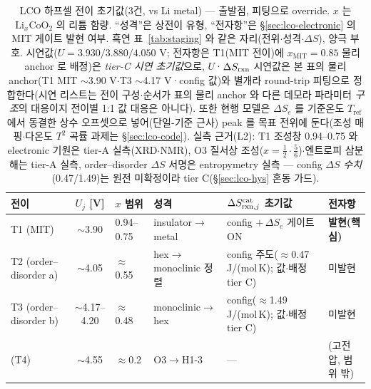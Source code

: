 \begin{table}[t]
\centering\footnotesize
\renewcommand{\arraystretch}{1.3}
\caption{LCO 하프셀 전이 초기값(3건, vs Li metal) --- 출발점, 피팅으로 override. $x$ 는
$\mathrm{Li}_x\mathrm{CoO_2}$ 의 리튬 함량. ``성격''은 상전이 유형, ``전자항''은 \S\ref{sec:lco-electronic} 의 MIT
게이트 발현 여부. 흑연 표~\ref{tab:staging} 와 같은 자리(전위$\cdot$성격$\cdot\Delta S$), 양극 부호.
시연값($U{=}3.930/3.880/4.050$ V; 전자항은 T1(MIT 전이)에
$x_\mathrm{MIT}{=}0.85$ 물리 anchor 로 배정)은
\emph{tier-C 시연 초기값}으로, $U$·$\Delta S_{\mathrm{rxn}}$ 시연값은 본 표의 물리 anchor(T1 MIT $\sim$3.90 V$\cdot$T3 $\sim$4.17 V·config 값)와
별개라 round-trip 피팅으로 정합한다(시연 리스트는 전이 구성$\cdot$순서가 표의 물리 anchor 와 다른 데모라 파라미터 \emph{구조}의 대응이지 전이별 1:1 값 대응은 아니다). 또한 현행 모델은 $\Delta S_e$ 를 기준온도 $T_\mathrm{ref}$ 에서
동결한 상수 오프셋으로 넣어(단일-기준 근사) peak 를 목표 전위에 둔다(조성 매핑$\cdot$다온도 $T^2$ 곡률
과제는 \S\ref{sec:lco-code}). 실측 근거(L2): T1 조성창 0.94--0.75 와 electronic 기원은 tier-A
실측\cite{menetrier1999}(XRD$\cdot$NMR), O3 질서상 조성($x{=}\tfrac12\cdot\tfrac56$)$\cdot$엔트로피 삼분해는 tier-A
실측\cite{reynier2004}, order--disorder $\Delta S$ 서명은 entropymetry 실측\cite{kim_entropymetry2020} ---
config $\Delta S$ \emph{수치}(0.47/1.49)는 원전 미확정이라 tier C(\S\ref{sec:lco-hys} 혼동 가드).}
\label{tab:lco-staging}
\begin{tabular}{@{}p{} c p{} p{} p{} p{}@{}}
\toprule
전이 & $U_j$ [V] & $x$ 범위 & 성격 & $\Delta S_{\mathrm{rxn},j}^\mathrm{cat}$ 초기값 & 전자항 \\
\midrule
T1 (MIT)              & $\sim$3.90        & 0.94--0.75 & insulator$\to$metal       & config $+\,\Delta S_e$ 게이트 ON & \textbf{발현(핵심)} \\
T2 (order--disorder a)& $\sim$4.05        & $\approx$0.55 & hex$\to$monoclinic 정렬 & config 주도($\approx$0.47 J/(mol\,K); 값$\cdot$배정 tier C) & 미발현 \\
T3 (order--disorder b)& $\sim$4.17--4.20  & $\approx$0.48 & monoclinic$\to$hex      & config($\approx$1.49 J/(mol\,K); 값$\cdot$배정 tier C) & 미발현 \\
\midrule
(T4)                  & $\sim$4.55        & $\approx$0.2 & O3$\to$H1-3              & --- & (고전압, 범위 밖) \\
\bottomrule
\end{tabular}
\end{table}

